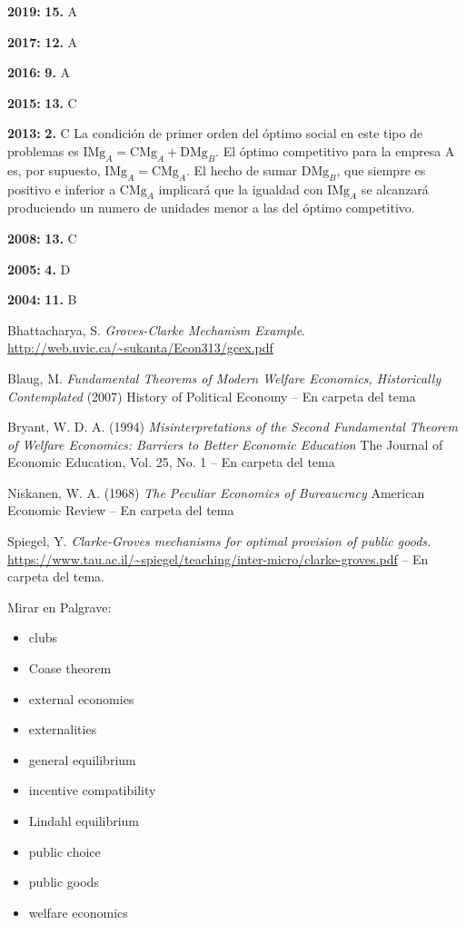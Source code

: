 \documentclass{nuevotema}
\begin{document}
\notas

\textbf{2019:} \textbf{15.} A

\textbf{2017:} \textbf{12.} A

\textbf{2016:} \textbf{9.} A

\textbf{2015:} \textbf{13.} C

\textbf{2013:} \textbf{2.} C La condición de primer orden del óptimo social en este tipo de problemas es $\text{IMg}_A = \text{CMg}_A + \text{DMg}_B$. El óptimo competitivo para la empresa A es, por supuesto, $\text{IMg}_A = \text{CMg}_A$. El hecho de sumar $\text{DMg}_B$, que siempre es positivo e inferior a $\text{CMg}_A$ implicará que la igualdad con $\text{IMg}_A$ se alcanzará produciendo un numero de unidades menor a las del óptimo competitivo. 

\textbf{2008:} \textbf{13.} C

\textbf{2005:} \textbf{4.} D

\textbf{2004:} \textbf{11.} B



\bibliografia

Bhattacharya, S. \textit{Groves-Clarke Mechanism Example}. \url{http://web.uvic.ca/~sukanta/Econ313/gcex.pdf}

Blaug, M. \textit{Fundamental Theorems of Modern Welfare Economics, Historically Contemplated} (2007) History of Political Economy -- En carpeta del tema

Bryant, W. D. A. (1994) \textit{Misinterpretations of the Second Fundamental Theorem of Welfare Economics: Barriers to Better Economic Education} The Journal of Economic Education, Vol. 25, No. 1 -- En carpeta del tema


Niskanen, W. A. (1968) \textit{The Peculiar Economics of Bureaucracy} American Economic Review -- En carpeta del tema

Spiegel, Y. \textit{Clarke-Groves mechanisms for optimal provision of public goods.} \url{https://www.tau.ac.il/~spiegel/teaching/inter-micro/clarke-groves.pdf} -- En carpeta del tema.

Mirar en Palgrave:
\begin{itemize} 
	\item clubs
	\item Coase theorem
	\item external economies
	\item externalities
	\item general equilibrium
	\item incentive compatibility
	\item Lindahl equilibrium
	\item public choice
	\item public goods
	\item welfare economics
\end{itemize}
\end{document}
